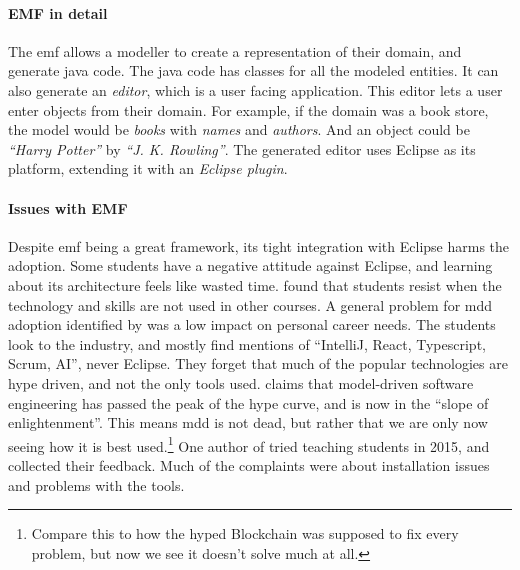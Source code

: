 \paragraph*{EMF in detail}
The \acrlong{emf} allows a modeller to create a representation of their domain, and generate java code. The java code has classes for all the modeled entities.
It can also generate an \textit{editor}, which is a user facing application.
This editor lets a user enter objects from their domain. For example, if the domain was a book store, the model would be \textit{books} with \textit{names} and \textit{authors}. And an object could be \textit{``Harry Potter''} by \textit{``J. K. Rowling''}. The generated editor uses \gls{Eclipse} as its platform, extending it with an \textit{Eclipse plugin}.

\paragraph*{Issues with EMF}
Despite \acrshort{emf} being a great framework, its tight integration with \gls{Eclipse} harms the adoption. Some students have a negative attitude against \gls{Eclipse}, and learning about its architecture feels like wasted time.
\textcite{kuzniarzTeachingModelDrivenSoftware2016} found that students resist when the technology and skills are not used in other courses.
A general problem for \acrshort{mdd} adoption identified by \textcite{jonwhittleTaxonomyToolrelatedIssues2015} was a low impact on personal career needs. 
The students look to the industry, and mostly find mentions of ``IntelliJ, React, Typescript, Scrum, AI'', never Eclipse. They forget that much of the popular technologies are hype driven, and not the only tools used.
\textcite[p.~21--23]{brambillaModelDrivenSoftwareEngineering2017} claims that model-driven software engineering has passed the peak of the hype curve, and is now in the ``slope of enlightenment''. This means \acrshort{mdd} is not dead, but rather that we are only now seeing how it is best used.\footnote{Compare this to how the hyped Blockchain was supposed to fix every problem, but now we see it doesn't solve much at all.} One author of \cite{brambillaModelDrivenSoftwareEngineering2017} tried teaching students in 2015, and collected their feedback. Much of the complaints were about installation issues and problems with the tools. \cite{jordicabotFailedConvinceMy2015}







